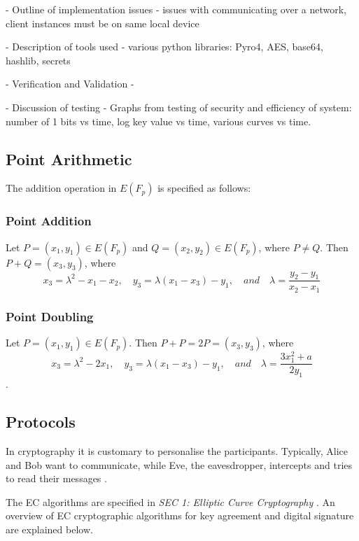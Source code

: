 \documentclass[12pt,a4paper]{article}
\begin{document}
- Outline of implementation issues - issues with communicating over a network, client instances must be on same local device

- Description of tools used - various python libraries: Pyro4, AES, base64, hashlib, secrets

- Verification and Validation - 

- Discussion of testing - Graphs from testing of security and efficiency of system: number of 1 bits vs time, log key value vs time, various curves vs time.

\subsection{Point Arithmetic} \label{Point Arithmetic}
The addition operation in $E(F_p)$ is specified as follows:

\subsubsection{Point Addition} \label{Point Addition}
Let $P = (x_1,y_1) \in E(F_p)$ and $Q = (x_2,y_2) \in E(F_p)$, where $P \neq Q$. 
Then $P + Q = (x_3,y_3)$, where
\begin{equation}
    x_3 = \lambda^2 - x_1 - x_2, \quad y_3 = \lambda(x_1 - x_3) - y_1, \quad and \quad \lambda = \frac{y_2-y_1}{x_2-x_1}
\end{equation}

\subsubsection{Point Doubling} \label{Point Doubling}
Let $P = (x_1,y_1) \in E(F_p)$. 
Then $P + P = 2P = (x_3,y_3)$, where
\begin{equation}
    x_3 = \lambda^2 - 2x_1, \quad y_3 = \lambda(x_1 - x_3) - y_1, \quad and \quad \lambda = \frac{3x_1^2 + a}{2y_1}
\end{equation}
\cite{lopez2000overview}.

\subsection{Protocols} \label{Protocols}
In cryptography it is customary to personalise the participants. 
Typically, Alice and Bob want to communicate, while Eve, the eavesdropper, 
intercepts and tries to read their messages \cite{silverman2009arithmetic}.

The EC algorithms are specified in \emph{SEC 1: Elliptic Curve Cryptography} \cite{brown2009standards}. 
An overview of EC cryptographic algorithms for key agreement and digital signature are explained below.
\end{document}
